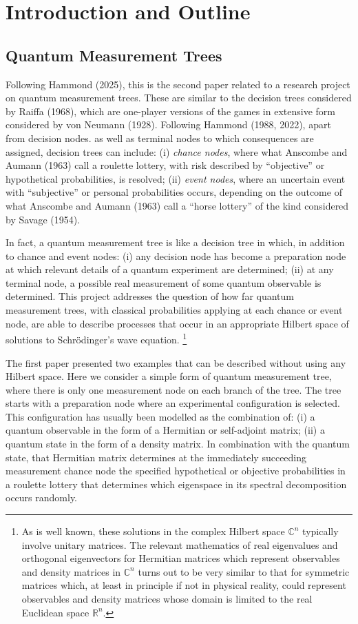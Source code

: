 \documentclass[11pt]{article}
\newcommand \R { \mathbb{R} }
\newcommand \C { \mathbb{C} }
\begin{document}
\section{Introduction and Outline}
\subsection{Quantum Measurement Trees}

Following Hammond (2025), this is the second paper related to a research project 
on quantum measurement trees.
These are similar to the decision trees considered by Raiffa (1968), 
which are one-player versions of the games in extensive form 
considered by von Neumann (1928).
Following Hammond (1988, 2022), apart from decision nodes. 
as well as terminal nodes to which consequences are assigned, decision trees can include: 
(i) \emph{chance nodes}, where what Anscombe and Aumann (1963) call a roulette lottery, 
with risk described by ``objective'' or hypothetical probabilities, is resolved;
(ii) \emph{event nodes}, where an uncertain event
with ``subjective'' or personal probabilities occurs, 
depending on the outcome of what Anscombe and Aumann (1963) 
call a ``horse lottery'' of the kind considered by Savage (1954).

In fact, a quantum measurement tree is like a decision tree in which, 
in addition to chance and event nodes:
(i) any decision node has become a preparation node 
at which relevant details of a quantum experiment are determined;
(ii) at any terminal node, a possible real measurement of some quantum observable
is determined.
This project addresses the question of how far quantum measurement trees, 
with classical probabilities applying at each chance or event node, 
are able to describe processes that occur in an appropriate Hilbert space 
of solutions to Schr\"odinger's wave equation.%
\footnote{As is well known, these solutions in the complex Hilbert space $ \C^n $ 
typically involve unitary matrices. 
The relevant mathematics of real eigenvalues and orthogonal eigenvectors 
for Hermitian matrices which represent observables and density matrices in $ \C^n $  
turns out to be very similar to that for symmetric matrices which, 
at least in principle if not in physical reality,
could represent observables and density matrices 
whose domain is limited to the real Euclidean space $ \R^n $.}

The first paper presented two examples that can be described without using any Hilbert space.
Here we consider a simple form of quantum measurement tree, 
where there is only one measurement node on each branch of the tree.
The tree starts with a preparation node where an experimental configuration is selected.
This configuration has usually been modelled as the combination of:
(i) a quantum observable in the form of a Hermitian or self-adjoint matrix;
(ii) a quantum state in the form of a density matrix. 
In combination with the quantum state, that Hermitian matrix 
determines at the immediately succeeding measurement chance node 
the specified hypothetical or objective probabilities in a roulette lottery
that determines which eigenspace in its spectral decomposition occurs randomly.
\end{document}
